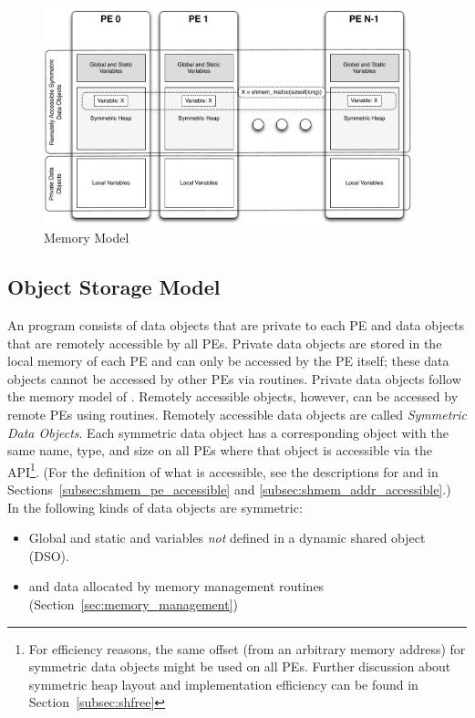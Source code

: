 \begin{figure}[h]
\includegraphics[width=0.95\textwidth]{figures/mem_model}
\caption{\openshmem Memory Model}
\label{fig:mem_model}
\end{figure}

\subsection{Object Storage Model}

An \openshmem program consists of data objects that are private to each \ac{PE}
and data  objects that are remotely accessible by all \acp{PE}. Private data
objects are stored in the local memory of each \ac{PE} and can only be accessed
by the \ac{PE} itself; these data objects cannot be accessed by other \acp{PE}
via \openshmem routines. Private data objects follow the memory model of
\Cstd. Remotely accessible objects, however, can be accessed by
remote \acp{PE} using \openshmem routines.  Remotely accessible data objects are
called \emph{Symmetric Data Objects}.  Each symmetric data object has a
corresponding object with the same name, type, and size on all \acp{PE} where that object is
accessible via the \openshmem \ac{API}\footnote{For efficiency reasons,
the same offset (from an arbitrary memory address) for symmetric data
objects might be used on all \acp{PE}. Further discussion about symmetric heap
layout and implementation efficiency can be found in Section~\ref{subsec:shfree}}.
(For the definition of what is accessible, see the
descriptions for  and 
in Sections~\ref{subsec:shmem_pe_accessible} and
\ref{subsec:shmem_addr_accessible}.) In \openshmem the following kinds of
data objects are symmetric:
%
\begin{itemize}
\item Global and static \Cstd and \Cpp variables \emph{not} defined in
  a dynamic shared object (DSO).
\item \Cstd and \Cpp data allocated by \openshmem memory management routines
  (Section~\ref{sec:memory_management})
\end{itemize}

